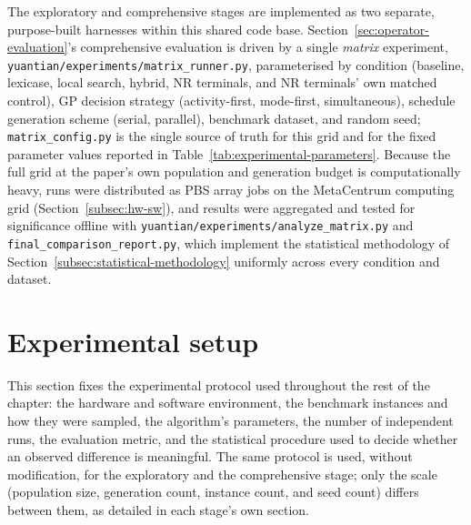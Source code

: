 The exploratory and comprehensive stages are implemented as two separate,
purpose-built harnesses within this shared code base. 
Section~\ref{sec:operator-evaluation}'s comprehensive evaluation is driven
by a single \emph{matrix} experiment,
\texttt{yuantian/experiments/matrix\_runner.py}, parameterised by condition
(baseline, lexicase, local search, hybrid, NR terminals, and NR terminals'
own matched control), GP decision strategy (activity-first, mode-first,
simultaneous), schedule generation scheme (serial, parallel), benchmark
dataset, and random seed; \texttt{matrix\_config.py} is the single source
of truth for this grid and for the fixed parameter values reported in
Table~\ref{tab:experimental-parameters}. Because the full grid at the
paper's own population and generation budget is computationally heavy, runs
were distributed as PBS array jobs on the MetaCentrum computing grid
(Section~\ref{subsec:hw-sw}), and results were aggregated and tested for
significance offline with \texttt{yuantian/experiments/analyze\_matrix.py}
and \texttt{final\_comparison\_report.py}, which implement the statistical
methodology of Section~\ref{subsec:statistical-methodology} uniformly
across every condition and dataset.

\section{Experimental setup}
\label{sec:experimental-setup}

This section fixes the experimental protocol used throughout the rest of
the chapter: the hardware and software environment, the benchmark
instances and how they were sampled, the algorithm's parameters, the number
of independent runs, the evaluation metric, and the statistical procedure
used to decide whether an observed difference is meaningful. The same
protocol is used, without modification, for the exploratory and the
comprehensive stage; only the scale (population size, generation count,
instance count, and seed count) differs between them, as detailed in each
stage's own section.


